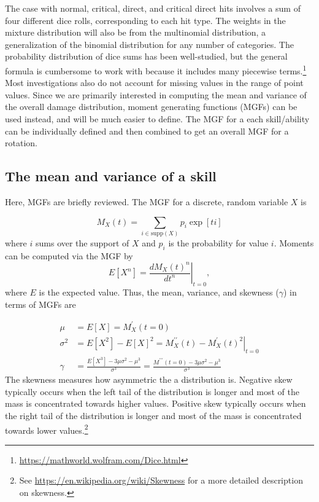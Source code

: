 \documentclass{article}
\begin{document}
        The case with normal, critical, direct, and critical direct hits involves a sum of four different dice rolls, corresponding to each hit type. The weights in the mixture distribution will also be from the multinomial distribution, a generalization of the binomial distribution for any number of categories. The probability distribution of dice sums has been well-studied, but the general formula is cumbersome to work with because it includes many piecewise terms.\footnote{\url{https://mathworld.wolfram.com/Dice.html}} Most investigations also do not account for missing values in the range of point values. Since we are primarily interested in computing the mean and variance of the overall damage distribution, moment generating functions (MGFs) can be used instead, and will be much easier to define. The MGF for a each skill/ability can be individually defined and then combined to get an overall MGF for a rotation.

        \subsection{The mean and variance of a skill}

        Here, MGFs are briefly reviewed. The MGF for a discrete, random variable $X$ is

        \begin{equation}
            M_X(t) = \sum_{i \in \textrm{supp}(X)} p_i \exp[ti]
        \end{equation}
        where $i$ sums over the support of $X$ and $p_i$ is the probability for value $i$. Moments can be computed via the MGF by
        \begin{equation}\label{eqn:expected-deriv}
            E[X^n] = \left.\frac{d M_X(t)^n}{dt^n} \right|_{t=0},
        \end{equation}
        where $E$ is the expected value. Thus, the mean, variance, and skewness ($\gamma$) in terms of MGFs are

        \begin{equation}\label{eqn:mean-var}
            \begin{split}
                \mu &= E[X] = M^\prime_X(t=0) \\
                \sigma^2 &= E[X^2] - E[X]^2 = \left. M^{\prime\prime}_X(t) - M^\prime_X(t)^2 \right|_{t=0}\\
                \gamma &= \frac{E[X^3] - 3\mu\sigma^2 - \mu^3}{\sigma^3} = \frac{M^{\prime\prime\prime}(t=0) - 3\mu\sigma^2 - \mu^3}{\sigma^3}
            \end{split}
        \end{equation}
        The skewness measures how asymmetric the a distribution is. Negative skew typically occurs when the left tail of the distribution is longer and most of the mass is concentrated towards higher values. Positive skew typically occurs when the right tail of the distribution is longer and most of the mass is concentrated towards lower values.\footnote{See \url{https://en.wikipedia.org/wiki/Skewness} for a more detailed description on skewness.}
                
\end{document}
